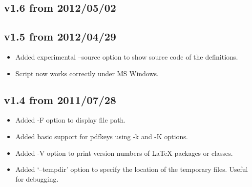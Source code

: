 \documentclass{article}
\begin{document}
\subsection*{v1.6 from 2012/05/02}

\subsection*{v1.5 from 2012/04/29}
\begin{itemize}
 \item Added experimental --source option to show source code of the definitions.
 \item Script now works correctly under MS Windows.
\end{itemize}

\subsection*{v1.4 from 2011/07/28}
\begin{itemize}
 \item Added -F option to display file path.
 \item Added basic support for pdfkeys using -k and -K options.
 \item Added -V option to print version numbers of LaTeX packages or classes.
 \item Added `--tempdir' option to specify the location of the temporary files. Useful for debugging.
\end{itemize}
\end{document}
